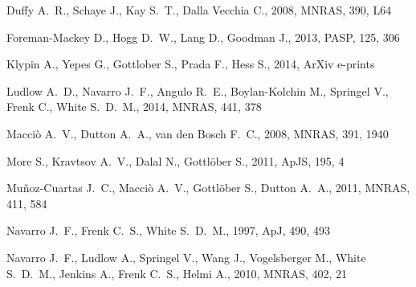 \documentclass[a4,useAMS,usenatbib,usegraphicx]{mn2e}
\newcommand{\apj}{ApJ}
\newcommand{\apjs}{ApJS}
\newcommand{\mnras}{MNRAS}
\newcommand{\pasp}{PASP}
\begin{document}

%
\begin{thebibliography}{}

{Duffy} A.~R.,  {Schaye} J.,  {Kay} S.~T.,    {Dalla Vecchia} C.,  2008,
  \mnras, 390, L64

{Foreman-Mackey} D.,  {Hogg} D.~W.,  {Lang} D.,    {Goodman} J.,  2013, \pasp,
  125, 306

{Klypin} A.,  {Yepes} G.,  {Gottlober} S.,  {Prada} F.,    {Hess} S.,  2014,
  ArXiv e-prints

{Ludlow} A.~D.,  {Navarro} J.~F.,  {Angulo} R.~E.,  {Boylan-Kolchin} M.,
  {Springel} V.,  {Frenk} C.,    {White} S.~D.~M.,  2014, \mnras, 441, 378

{Macci{\`o}} A.~V.,  {Dutton} A.~A.,    {van den Bosch} F.~C.,  2008, \mnras,
  391, 1940

{More} S.,  {Kravtsov} A.~V.,  {Dalal} N.,    {Gottl{\"o}ber} S.,  2011, \apjs,
  195, 4

{Mu{\~n}oz-Cuartas} J.~C.,  {Macci{\`o}} A.~V.,  {Gottl{\"o}ber} S.,
  {Dutton} A.~A.,  2011, \mnras, 411, 584

{Navarro} J.~F.,  {Frenk} C.~S.,    {White} S.~D.~M.,  1997, \apj, 490, 493

{Navarro} J.~F.,  {Ludlow} A.,  {Springel} V.,  {Wang} J.,  {Vogelsberger} M.,
  {White} S.~D.~M.,  {Jenkins} A.,  {Frenk} C.~S.,    {Helmi} A.,  2010,
  \mnras, 402, 21


\end{thebibliography}
\end{document}
